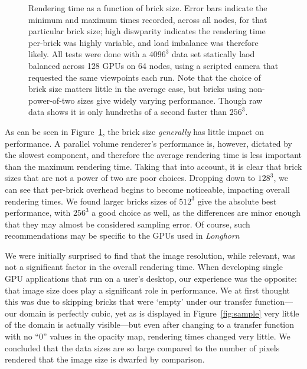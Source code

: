 \begin{figure}

  \caption{Rendering time as a function of brick size.  Error bars
  indicate the minimum and maximum times recorded, across all nodes,
  for that particular brick size; high diswparity indicates the
  rendering time per-brick was highly variable, and load imbalance
  was therefore likely.  All tests were done with a $4096^3$ data
  set statically laod balanced across 128 GPUs on 64 nodes, using a
  scripted camera that requested the same viewpoints each run.  Note
  that the choice of brick size matters little in the average case, but
  bricks using non-power-of-two sizes give widely varying performance.
  Though raw data shows it is only hundreths of a second faster than
  $256^3$.}
  \label{fig:bsize}
\end{figure}

As can be seen in Figure~\ref{fig:bsize}, the brick size
\emph{generally} has little impact on performance.  A parallel volume
renderer's performance is, however, dictated by the slowest component,
and therefore the average rendering time is less important than the
maximum rendering time.  Taking that into account, it is clear that
brick sizes that are not a power of two are poor choices.  Dropping
down to $128^3$, we can see that per-brick overhead begins to become
noticeable, impacting overall rendering times.  We found larger bricks
sizes of $512^3$ give the absolute best performance, with $256^3$ a
good choice as well, as the differences are minor enough that they may
almost be considered sampling error.  Of course, such recommendations
may be specific to the GPUs
used in \textit{Longhorn}

We were initially surprised to find that the image resolution, while
relevant, was not a significant factor in the overall rendering
time.  When developing single GPU applications that run on a user's
desktop, our experience was the opposite: that image size does play a
significant role in performance.  We at first thought this was due to
skipping bricks that were `empty' under our transfer function---our
domain is perfectly cubic, yet as is displayed in
Figure~\ref{fig:sample} very little of the domain is actually
visible---but even after changing to a transfer function with no ``0''
values in the opacity map, rendering times changed very little.  We
concluded that the data sizes are so large compared to the number of
pixels rendered that the image size is dwarfed by comparison.

